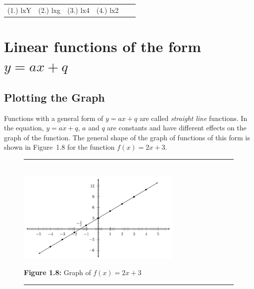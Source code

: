  \par \begin{tabular}[h]{cccccc}
 (1.) lxY  &  (2.) lxg  &  (3.) lx4  &  (4.) lx2  & \end{tabular}
% 
%     
%     
%     
%     
 \label{m39338*uid68}
            \section{ Linear functions of the form $y=ax+q$}
            \nopagebreak
 \subsection{Plotting the Graph}       
        \label{m39338*id237465}Functions with a general form of $y=ax+q$ are called \textsl{straight line} functions. In the equation, $y=ax+q$, $a$ and $q$ are constants and have different effects on the graph of the function. The general shape of the graph of functions of this form is shown in Figure~1.8 for the function $f\left(x\right)=2x+3$.\par 
    \setcounter{subfigure}{0}
	\begin{figure}[H] %
    \begin{center}
    \rule[.1in]{\figurerulewidth}{.005in} \\
        \label{m39338*uid69!!!underscore!!!media}\label{m39338*uid69!!!underscore!!!printimage}\includegraphics[width=300px]{col11306.imgs/m39338_MG10C11_005.png} %
      \vspace{2pt}
    \vspace{\rubberspace}\par \begin{cnxcaption}
	  \small \textbf{Figure 1.8: }Graph of $f\left(x\right)=2x+3$
	\end{cnxcaption}
    \vspace{.1in}
    \rule[.1in]{\figurerulewidth}{.005in} \\
    \end{center}
 \end{figure}       
\label{m39338*secfhsst!!!underscore!!!id833}

